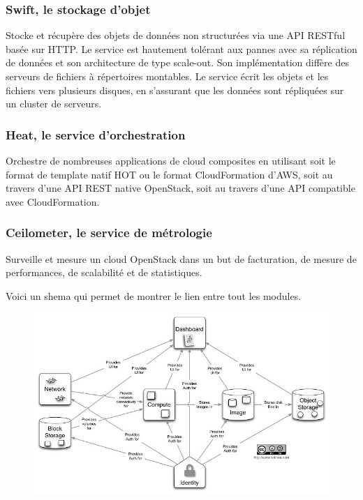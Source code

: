 \documentclass[]{article}
\begin{document}
\subsubsection{Swift, le stockage
d'objet}\label{swift-le-stockage-dobjet}

Stocke et récupère des objets de données non structurées via une API
RESTful basée sur HTTP. Le service est hautement tolérant aux pannes
avec sa réplication de données et son architecture de type scale-out.
Son implémentation diffère des serveurs de fichiers à répertoires
montables. Le service écrit les objets et les fichiers vers plusieurs
disques, en s'assurant que les données sont répliquées sur un cluster de
serveurs.

\subsubsection{Heat, le service
d'orchestration}\label{heat-le-service-dorchestration}

Orchestre de nombreuses applications de cloud composites en utilisant
soit le format de template natif HOT ou le format CloudFormation d'AWS,
soit au travers d'une API REST native OpenStack, soit au travers d'une
API compatible avec CloudFormation.

\subsubsection{Ceilometer, le service de
métrologie}\label{ceilometer-le-service-de-muxe9trologie}

Surveille et mesure un cloud OpenStack dans un but de facturation, de
mesure de performances, de scalabilité et de statistiques.

Voici un shema qui permet de montrer le lien entre tout les modules.

\begin{figure}
\centering
\includegraphics{../Momo/Openstack_diagramme_conceptuel.jpg}
\caption{}
\end{figure}
\end{document}

